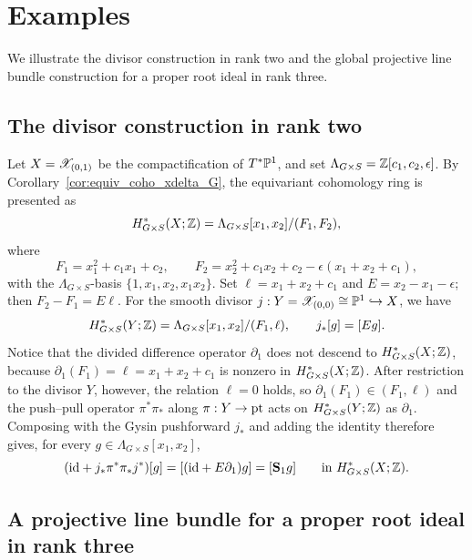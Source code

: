 \section{Examples}\label{sec:examples}

We illustrate the divisor construction in rank two and the global projective line
bundle construction for a proper root ideal in rank three.

\subsection{The divisor construction in rank two}

Let $X=\mathscr X_{(0,1)}$ be the compactification of $T^*\mathbb P^1$, and set $\Lambda_{G\times S}=\mathbb Z[c_1,c_2,\epsilon]$. By Corollary~\ref{cor:equiv_coho_xdelta_G}, the equivariant cohomology ring is presented as
\[
 H^*_{G\times S}(X;\mathbb Z)=\Lambda_{G\times S}[x_1,x_2]/(F_1,F_2),
\]
where
\[
 F_1=x_1^2+c_1x_1+c_2,\qquad
 F_2=x_2^2+c_1x_2+c_2-\epsilon(x_1+x_2+c_1),
\]
with the $\Lambda_{G\times S}$-basis $\{1,x_1,x_2,x_1x_2\}$.
Set $\ell=x_1+x_2+c_1$ and $E=x_2-x_1-\epsilon$; then
$F_2-F_1=E\ell$.
For the smooth divisor $j:Y=\mathscr X_{(0,0)}\cong\mathbb P^1\hookrightarrow X$, we have
\[
 H^*_{G\times S}(Y;\mathbb Z)=\Lambda_{G\times S}[x_1,x_2]/(F_1,\ell),\qquad
 j_*[g]=[Eg].
\]
Notice that the divided difference operator $\partial_1$ does not descend to $H^*_{G\times S}(X;\mathbb Z)$, because
$\partial_1(F_1)=\ell=x_1+x_2+c_1$ is nonzero in $H^*_{G\times S}(X;\mathbb Z)$.
After restriction to the divisor $Y$, however, the relation $\ell=0$ holds, so $\partial_1(F_1)\in(F_1,\ell)$ and the push--pull operator $\pi^*\pi_*$ along
$\pi:Y\to\mathrm{pt}$ acts on $H^*_{G\times S}(Y;\mathbb Z)$ as $\partial_1$.
Composing with the Gysin pushforward $j_*$ and adding the identity therefore gives, for every $g\in \Lambda_{G\times S}[x_1,x_2]$,
\[
 (\mathrm{id}+j_*\pi^*\pi_*j^*)[g]=[(\mathrm{id}+E\partial_1)g]=[\mathbf S_1g]\qquad\text{in }H^*_{G\times S}(X;\mathbb Z).
\]

\subsection{A projective line bundle for a proper root ideal in rank three}

